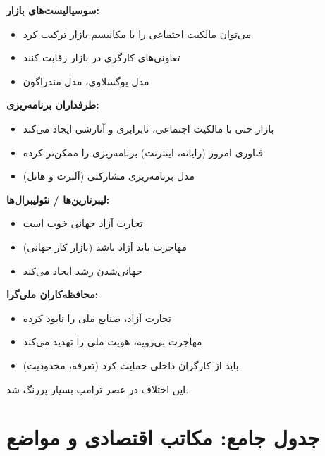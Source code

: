\begin{debatebox}
\textbf{سوسیالیست‌های بازار:}
\begin{itemize}[nosep]
    \item می‌توان مالکیت اجتماعی را با مکانیسم بازار ترکیب کرد
    \item تعاونی‌های کارگری در بازار رقابت کنند
    \item مدل یوگسلاوی، مدل مندراگون
\end{itemize}

\textbf{طرفداران برنامه‌ریزی:}
\begin{itemize}[nosep]
    \item بازار حتی با مالکیت اجتماعی، نابرابری و آنارشی ایجاد می‌کند
    \item فناوری امروز (رایانه، اینترنت) برنامه‌ریزی را ممکن‌تر کرده
    \item مدل برنامه‌ریزی مشارکتی (آلبرت و هانل)
\end{itemize}
\end{debatebox}

\begin{debatebox}
\textbf{لیبرتارین‌ها / نئولیبرال‌ها:}
\begin{itemize}[nosep]
    \item تجارت آزاد جهانی خوب است
    \item مهاجرت باید آزاد باشد (بازار کار جهانی)
    \item جهانی‌شدن رشد ایجاد می‌کند
\end{itemize}

\textbf{محافظه‌کاران ملی‌گرا:}
\begin{itemize}[nosep]
    \item تجارت آزاد، صنایع ملی را نابود کرده
    \item مهاجرت بی‌رویه، هویت ملی را تهدید می‌کند
    \item باید از کارگران داخلی حمایت کرد (تعرفه، محدودیت)
\end{itemize}
این اختلاف در عصر ترامپ بسیار پررنگ شد.
\end{debatebox}

\section{جدول جامع: مکاتب اقتصادی و مواضع}

